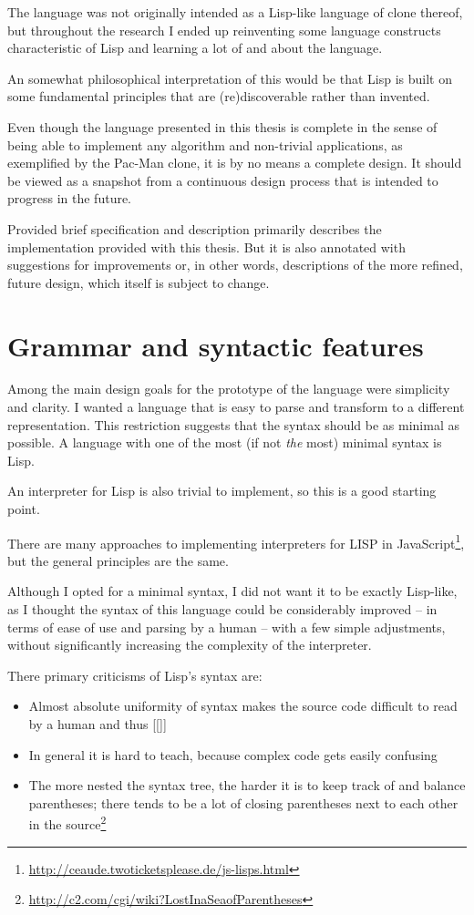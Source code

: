 The language was not originally intended as a Lisp-like language of clone
thereof, but throughout the research I ended up reinventing some language
constructs characteristic of Lisp and learning a lot of and about the language.

An somewhat philosophical interpretation of this would be that Lisp is built on
some fundamental principles that are (re)discoverable rather than invented.

Even though the language presented in this thesis is complete in the sense of
being able to implement any algorithm and non-trivial applications, as
exemplified by the Pac-Man clone, it is by no means a complete design. It should
be viewed as a snapshot from a continuous design process that is intended to
progress in the future.

Provided brief specification and description primarily describes the
implementation provided with this thesis. But it is also annotated with
suggestions for improvements or, in other words, descriptions of the more
refined, future design, which itself is subject to change.

\section{Grammar and syntactic features}
Among the main design goals for the prototype of the language were simplicity
and clarity. I wanted a language that is easy to parse and transform to a
different representation. This restriction suggests that the syntax should be as
minimal as possible. A language with one of the most (if not \textit{the} most)
minimal syntax is Lisp\cite{syntaxation}.

An interpreter for Lisp is also trivial to implement, so this is a good starting
point.

There are many approaches to implementing interpreters for LISP in
JavaScript\footnote{\url{http://ceaude.twoticketsplease.de/js-lisps.html}}, but
the general principles are the same.

Although I opted for a minimal syntax, I did not want it to be exactly
Lisp-like, as I thought the syntax of this language could be considerably
improved -- in terms of ease of use and parsing by a human -- with a few simple
adjustments, without significantly increasing the complexity of the interpreter.

There primary criticisms of Lisp's syntax are:
\begin{itemize}
    \item Almost absolute uniformity of syntax makes the source code difficult
      to read by a human and thus [[]]
    \item In general it is hard to teach\cite{wadler_critique}, because complex
      code gets easily confusing
    \item The more nested the syntax tree, the harder it is to keep track of and
      balance parentheses; there tends to be a lot of closing parentheses next
      to each other in the
      source\footnote{\url{http://c2.com/cgi/wiki?LostInaSeaofParentheses}}
\end{itemize}

